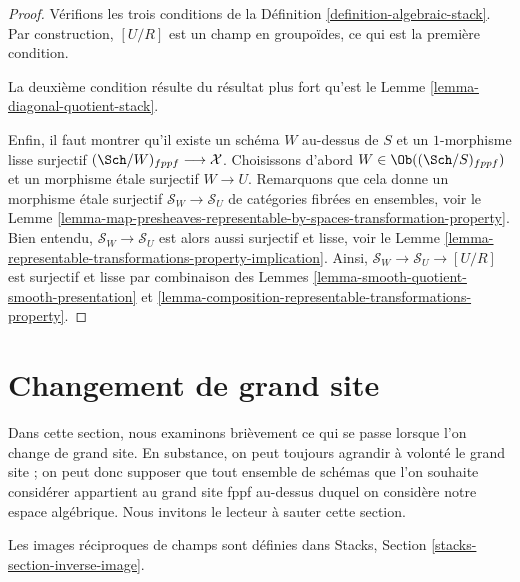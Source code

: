 \begin{proof}
Vérifions les trois conditions de la
Définition \ref{definition-algebraic-stack}.
Par construction, $[U/R]$ est un champ en groupoïdes,
ce qui est la première condition.

\medskip\noindent
La deuxième condition résulte du résultat plus fort qu'est le
Lemme \ref{lemma-diagonal-quotient-stack}.

\medskip\noindent
Enfin, il faut montrer qu'il existe un schéma $W$ au-dessus de $S$
et un $1$-morphisme lisse surjectif
$(\Sch/W)_{fppf} \longrightarrow \mathcal{X}$.
Choisissons d'abord $W \in \Ob((\Sch/S)_{fppf})$ et un
morphisme \'etale surjectif $W \to U$. Remarquons que cela
donne un morphisme \'etale surjectif $\mathcal{S}_W \to \mathcal{S}_U$
de catégories fibrées en ensembles, voir le
Lemme
\ref{lemma-map-presheaves-representable-by-spaces-transformation-property}.
Bien entendu, $\mathcal{S}_W \to \mathcal{S}_U$ est alors aussi surjectif et
lisse, voir le
Lemme \ref{lemma-representable-transformations-property-implication}.
Ainsi, $\mathcal{S}_W \to \mathcal{S}_U \to [U/R]$ est surjectif
et lisse par combinaison des
Lemmes \ref{lemma-smooth-quotient-smooth-presentation} et
\ref{lemma-composition-representable-transformations-property}.
\end{proof}





\section{Changement de grand site}
\label{section-change-big-site}

\noindent
Dans cette section, nous examinons brièvement ce qui se passe lorsque l'on change de grand site.
En substance, on peut toujours agrandir à volonté le grand site ; on peut donc
supposer que tout ensemble de schémas que l'on souhaite considérer appartient au grand
site fppf au-dessus duquel on considère notre espace algébrique.
Nous invitons le lecteur à sauter cette section.

\medskip\noindent
Les images réciproques de champs sont définies dans
Stacks, Section \ref{stacks-section-inverse-image}.

